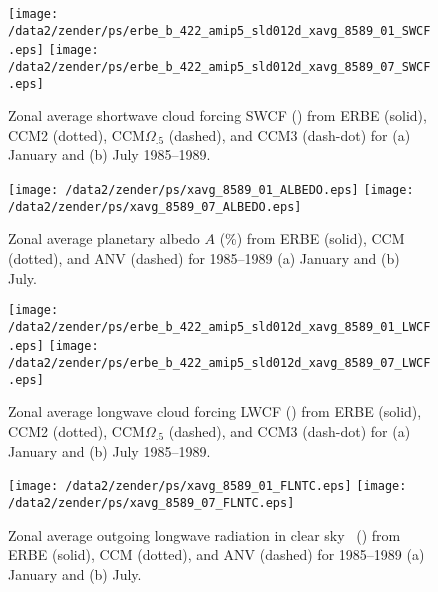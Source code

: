 \documentclass[twocolumn,final]{article}
\begin{document}
\begin{figure}
\begin{center}
\texttt{[image: /data2/zender/ps/erbe\_b\_422\_amip5\_sld012d\_xavg\_8589\_01\_SWCF.eps]}\vfill
\texttt{[image: /data2/zender/ps/erbe\_b\_422\_amip5\_sld012d\_xavg\_8589\_07\_SWCF.eps]}\vfill
\end{center}
\caption[Zonal average shortwave cloud forcing SWCF from ERBE,
CCM2, CCM$\Omega_{.5}$, and CCM3 for 1985--1989 January and July]{  
Zonal average shortwave cloud forcing SWCF (\wxmS) from ERBE
(solid), CCM2 (dotted), CCM$\Omega_{.5}$ (dashed), and CCM3 (dash-dot)
for (a) January and (b) July 1985--1989. 
\label{fig:xavg_8589_SWCF}}   
\end{figure}

\begin{figure}
\begin{center}
\texttt{[image: /data2/zender/ps/xavg\_8589\_01\_ALBEDO.eps]}\vfill
\texttt{[image: /data2/zender/ps/xavg\_8589\_07\_ALBEDO.eps]}\vfill
\end{center}
\caption[Zonal average planetary albedo $A$ from ERBE, CCM, and
ANV for 1985--1989 January and July]{ 
Zonal average planetary albedo $A$ (\%) from ERBE (solid), CCM
(dotted), and ANV (dashed) for 1985--1989 (a) January and (b) July.  
\label{fig:xavg_8589_ALBEDO}}   
\end{figure}

\begin{figure}
\begin{center}
\texttt{[image: /data2/zender/ps/erbe\_b\_422\_amip5\_sld012d\_xavg\_8589\_01\_LWCF.eps]}\vfill
\texttt{[image: /data2/zender/ps/erbe\_b\_422\_amip5\_sld012d\_xavg\_8589\_07\_LWCF.eps]}\vfill
\end{center}
\caption[Zonal average longwave cloud forcing LWCF from ERBE,
CCM, and ANV for 1985--1989 January and July]{
Zonal average longwave cloud forcing LWCF (\wxmS) from ERBE
(solid), CCM2 (dotted), CCM$\Omega_{.5}$ (dashed), and CCM3 (dash-dot)
for (a) January and (b) July 1985--1989. 
\label{fig:xavg_8589_LWCF}}   
\end{figure}

\begin{figure}
\begin{center}
\texttt{[image: /data2/zender/ps/xavg\_8589\_01\_FLNTC.eps]}\vfill
\texttt{[image: /data2/zender/ps/xavg\_8589\_07\_FLNTC.eps]}\vfill
\end{center}
\caption[Zonal average outgoing longwave radiation in clear sky
\OLRc\ from ERBE, CCM, and ANV for 1985--1989 January and
July]{ 
Zonal average outgoing longwave radiation in clear sky
\OLRc\ (\wxmS) from ERBE (solid), CCM (dotted), and ANV (dashed) for
1985--1989 (a) January and (b) July. 
\label{fig:xavg_8589_FLNTC}}   
\end{figure}
\clearpage
\end{document}
